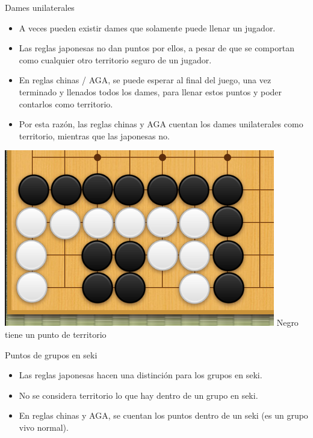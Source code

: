\documentclass{beamer}
\begin{document}
\begin{frame}{Dames unilaterales}

    \begin{itemize}
        \item A veces pueden existir dames que solamente puede llenar un jugador.
        \item Las reglas japonesas no dan puntos por ellos, a pesar de que se comportan como cualquier otro territorio seguro de un jugador.
        \item En reglas chinas / AGA, se puede esperar al final del juego, una vez terminado y llenados todos los dames, para llenar estos puntos y poder contarlos como territorio.
        \item Por esta razón, las reglas chinas y AGA cuentan los dames unilaterales como territorio, mientras que las japonesas no.
    \end{itemize}
  
    \includegraphics[scale=0.3]{unilateral.png} Negro tiene un punto de territorio
  
\end{frame}

\begin{frame}{Puntos de grupos en seki}

    \begin{itemize}
        \item Las reglas japonesas hacen una distinción para los grupos en seki.
        \item No se considera territorio lo que hay dentro de un grupo en seki.
        \item En reglas chinas y AGA, se cuentan los puntos dentro de un seki (es un grupo vivo normal).
    \end{itemize}
  
\end{frame}
\end{document}
